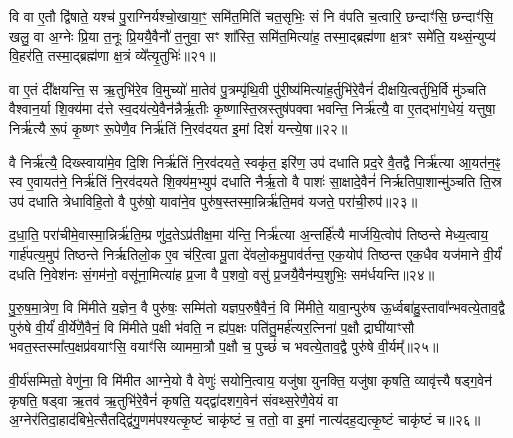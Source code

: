 {}

वि वा ए॒तौ द्वि॑षाते॒ यश्च॑ पु॒राग्निर्यश्चो॒खाया॒ꣳ॒ समि॑त॒मिति॑ चत॒सृभिः॒ सं नि व॑पति च॒त्वारि॒ छन्दाꣳ॑सि॒ छन्दाꣳ॑सि॒ खलु॒ वा अ॒ग्नेः प्रि॒या त॒नूः प्रि॒ययै॒वैनौ॑ त॒नुवा॒ सꣳ शा᳚स्ति॒ समि॑त॒मित्या॑ह॒ तस्मा॒द्ब्रह्म॑णा क्ष॒त्रꣳ समे॑ति॒ यथ्सं॒न्युप्य॑ वि॒हर॑ति॒ तस्मा॒द्ब्रह्म॑णा क्ष॒त्रं व्ये᳚त्यृ॒तुभिः॑॥२१॥

वा ए॒तं दी᳚क्षयन्ति॒ स ऋ॒तुभि॑रे॒व वि॒मुच्यो॑ मा॒तेव॑ पु॒त्रम्पृ॑थि॒वी पु॑री॒ष्य॑मित्या॑ह॒र्तुभि॑रे॒वैनं॑ दीक्षयि॒त्वर्तुभि॒र्वि मु॑ञ्चति वैश्वान॒र्या शि॒क्य॑मा द॑त्ते स्व॒दय॑त्ये॒वैन॑न्नैर्\mbox{}ऋ॒तीः कृ॒ष्णास्ति॒स्रस्तुष॑पक्वा भवन्ति॒ निर्\mbox{}ऋ॑त्यै॒ वा ए॒तद्भा॑ग॒धेयं॒ यत्तुषा॒ निर्\mbox{}ऋ॑त्यै रू॒पं कृ॒ष्णꣳ रू॒पेणै॒व निर्\mbox{}ऋ॑तिं नि॒रव॑दयत इ॒मां दिशं॑ यन्त्ये॒षा॥२२॥

वै निर्\mbox{}ऋ॑त्यै॒ दिख्स्वाया॑मे॒व दि॒शि निर्\mbox{}ऋ॑तिं नि॒रव॑दयते॒ स्वकृ॑त॒ इरि॑ण॒ उप॑ दधाति प्रद॒रे वै॒तद्वै निर्\mbox{}ऋ॑त्या आ॒यत॑न॒ꣴ॒ स्व ए॒वायत॑ने॒ निर्\mbox{}ऋ॑तिं नि॒रव॑दयते शि॒क्य॑म॒भ्युप॑ दधाति नैर्\mbox{}ऋ॒तो वै पाशः॑ सा॒क्षादे॒वैनं॑ निर्\mbox{}ऋतिपा॒शान्मु॑ञ्चति ति॒स्र उप॑ दधाति त्रेधाविहि॒तो वै पुरु॑षो॒ यावा॑ने॒व पुरु॑ष॒स्तस्मा॒न्निर्\mbox{}ऋ॑ति॒मव॑ यजते॒ परा॑ची॒रुप॑॥२३॥

द॒धा॒ति॒ परा॑चीमे॒वास्मा॒न्निर्\mbox{}ऋ॑ति॒म्प्र णु॑द॒ते\-ऽप्र॑तीक्ष॒मा य॑न्ति॒ निर्\mbox{}ऋ॑त्या अ॒न्तर्\mbox{}हि॑त्यै मार्जयि॒त्वोप॑ तिष्ठन्ते मेध्य॒त्वाय॒ गार्\mbox{}ह॑पत्य॒मुप॑ तिष्ठन्ते निर्\mbox{}ऋतिलो॒क ए॒व च॑रि॒त्वा पू॒ता दे॑वलो॒कमु॒पाव॑र्तन्त॒ एक॒योप॑ तिष्ठन्त एक॒धैव यज॑माने वी॒र्यं॑ दधति नि॒वेश॑नः सं॒गम॑नो॒ वसू॑ना॒मित्या॑ह प्र॒जा वै प॒शवो॒ वसु॑ प्र॒जयै॒वैन॑म्प॒शुभिः॒ सम॑र्धयन्ति॥२४॥

{\anuvakamend[{ऋ॒तुभि॑रे॒षा परा॑ची॒रुपा॒ष्टाच॑त्वारिꣳशच्च॥४॥}]}

पु॒रु॒ष॒मा॒त्रेण॒ वि मि॑मीते य॒ज्ञेन॒ वै पुरु॑षः॒ सम्मि॑तो यज्ञप॒रुषै॒वैनं॒ वि मि॑मीते॒ यावा॒न्पुरु॑ष ऊ॒र्ध्वबा॑हु॒स्तावा᳚न्भव\-त्ये॒ताव॒द्वै पुरु॑षे वी॒र्यं॑ वी॒र्ये॑णै॒वैनं॒ वि मि॑मीते प॒क्षी भ॑वति॒ न ह्य॑प॒क्षः पति॑तु॒मर्\mbox{}ह॑त्यर॒त्निना॑ प॒क्षौ द्राघी॑याꣳसौ भवत॒स्तस्मा᳚त्प॒क्षप्र॑वयाꣳसि॒ वयाꣳ॑सि व्याममा॒त्रौ प॒क्षौ च॒ पुच्छं॑ च भवत्ये॒ताव॒द्वै पुरु॑षे वी॒र्यम्᳚॥२५॥

वी॒र्य॑सम्मितो॒ वेणु॑ना॒ वि मि॑मीत आग्ने॒यो वै वेणुः॑ सयोनि॒त्वाय॒ यजु॑षा युनक्ति॒ यजु॑षा कृषति॒ व्यावृ॑त्त्यै षड्ग॒वेन॑ कृषति॒ षड्वा ऋ॒तव॑ ऋ॒तुभि॑रे॒वैनं॑ कृषति॒ यद्द्वा॑दशग॒वेन॑ संवथ्स॒रेणै॒वेयं वा अ॒ग्नेर॑तिदा॒हाद॑बिभे॒त्सैतद्द्वि॑गु॒णम॑पश्यत्कृ॒ष्टं चाकृ॑ष्टं च॒ ततो॒ वा इ॒मां नात्य॑दह॒द्यत्कृ॒ष्टं चाकृ॑ष्टं च॥२६॥

